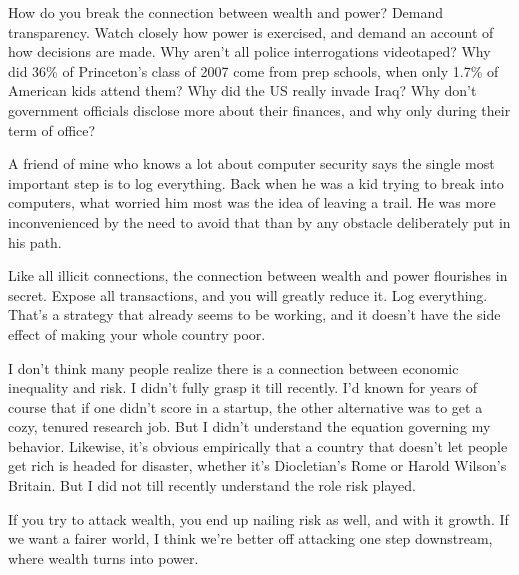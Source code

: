 How do you break the connection between
                  wealth and power? Demand transparency. Watch closely how power
                  is exercised, and demand an account of how decisions are made.
                  Why aren't all police interrogations videotaped? Why did 36\%
                  of Princeton's class of 2007 come from prep schools, when only
                  1.7\% of American kids attend them? Why did the US really
                  invade Iraq? Why don't government officials disclose more
                  about their finances, and why only during their term of
                  office?

A friend of mine who knows a lot about
                  computer security says the single most important step is to
                  log everything. Back when he was a kid trying to break into
                  computers, what worried him most was the idea of leaving a
                  trail. He was more inconvenienced by the need to avoid that
                  than by any obstacle deliberately put in his path.

Like
                  all illicit connections, the connection between wealth and
                  power flourishes in secret. Expose all transactions, and you
                  will greatly reduce it. Log everything. That's a strategy that
                  already seems to be working, and it doesn't have the side
                  effect of making your whole country poor.

I don't
                  think many people realize there is a connection between
                  economic inequality and risk. I didn't fully grasp it till
                  recently. I'd known for years of course that if one didn't
                  score in a startup, the other alternative was to get a cozy,
                  tenured research job. But I didn't understand the equation
                  governing my behavior. Likewise, it's obvious empirically that
                  a country that doesn't let people get rich is headed for
                  disaster, whether it's Diocletian's Rome or Harold Wilson's
                  Britain. But I did not till recently understand the role risk
                  played.

If you try to attack wealth, you end up
                  nailing risk as well, and with it growth. If we want a fairer
                  world, I think we're better off attacking one step downstream,
                  where wealth turns into power.



